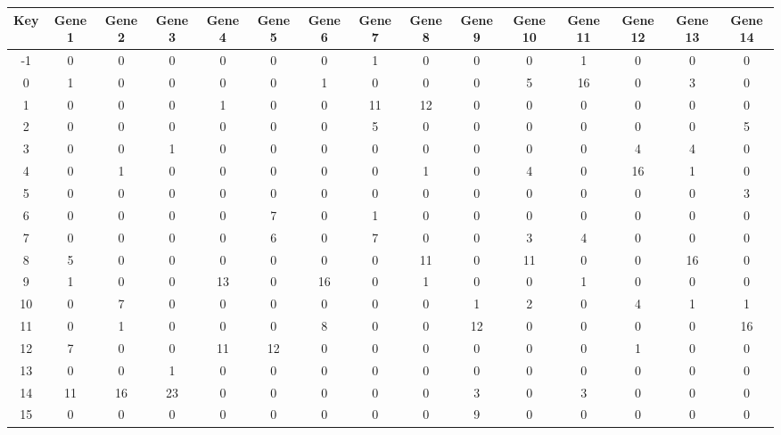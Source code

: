 \begin{tabular}{|c|c|c|c|c|c|c|c|c|c|c|c|c|c|c|}
\hline
Key & Gene 1 & Gene 2 & Gene 3 & Gene 4 & Gene 5 & Gene 6 & Gene 7 & Gene 8 & Gene 9 & Gene 10 & Gene 11 & Gene 12 & Gene 13 & Gene 14 \\
\hline
-1 & 0 & 0 & 0 & 0 & 0 & 0 & 1 & 0 & 0 & 0 & 1 & 0 & 0 & 0 \\
0 & 1 & 0 & 0 & 0 & 0 & 1 & 0 & 0 & 0 & 5 & 16 & 0 & 3 & 0 \\
1 & 0 & 0 & 0 & 1 & 0 & 0 & 11 & 12 & 0 & 0 & 0 & 0 & 0 & 0 \\
2 & 0 & 0 & 0 & 0 & 0 & 0 & 5 & 0 & 0 & 0 & 0 & 0 & 0 & 5 \\
3 & 0 & 0 & 1 & 0 & 0 & 0 & 0 & 0 & 0 & 0 & 0 & 4 & 4 & 0 \\
4 & 0 & 1 & 0 & 0 & 0 & 0 & 0 & 1 & 0 & 4 & 0 & 16 & 1 & 0 \\
5 & 0 & 0 & 0 & 0 & 0 & 0 & 0 & 0 & 0 & 0 & 0 & 0 & 0 & 3 \\
6 & 0 & 0 & 0 & 0 & 7 & 0 & 1 & 0 & 0 & 0 & 0 & 0 & 0 & 0 \\
7 & 0 & 0 & 0 & 0 & 6 & 0 & 7 & 0 & 0 & 3 & 4 & 0 & 0 & 0 \\
8 & 5 & 0 & 0 & 0 & 0 & 0 & 0 & 11 & 0 & 11 & 0 & 0 & 16 & 0 \\
9 & 1 & 0 & 0 & 13 & 0 & 16 & 0 & 1 & 0 & 0 & 1 & 0 & 0 & 0 \\
10 & 0 & 7 & 0 & 0 & 0 & 0 & 0 & 0 & 1 & 2 & 0 & 4 & 1 & 1 \\
11 & 0 & 1 & 0 & 0 & 0 & 8 & 0 & 0 & 12 & 0 & 0 & 0 & 0 & 16 \\
12 & 7 & 0 & 0 & 11 & 12 & 0 & 0 & 0 & 0 & 0 & 0 & 1 & 0 & 0 \\
13 & 0 & 0 & 1 & 0 & 0 & 0 & 0 & 0 & 0 & 0 & 0 & 0 & 0 & 0 \\
14 & 11 & 16 & 23 & 0 & 0 & 0 & 0 & 0 & 3 & 0 & 3 & 0 & 0 & 0 \\
15 & 0 & 0 & 0 & 0 & 0 & 0 & 0 & 0 & 9 & 0 & 0 & 0 & 0 & 0 \\
\hline
\end{tabular}